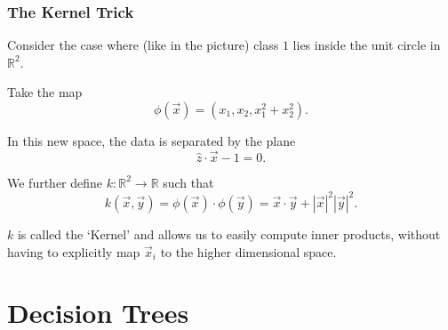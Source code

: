 \documentclass[mathserif,serif]{beamer}
\begin{document}
\begin{frame}
  \frametitle{The Kernel Trick}
  Consider the case where (like in the picture) class $1$ lies inside the unit circle in $\mathbb{R}^2$.

  \pause
  Take the map
  \begin{equation}
    \phi(\vec x) = (x_1, x_2, x_1^2+x_2^2).
  \end{equation}

  \pause
  In this new space, the data is separated by the plane
  \begin{equation}
    \hat z \cdot \vec x - 1 = 0.
  \end{equation}

  \pause
  We further define $k: \mathbb{R}^2 \to \mathbb{R}$ such that
  \begin{equation}
    k(\vec x, \vec y) = \phi(\vec x) \cdot \phi(\vec y) = \vec x \cdot \vec y + |\vec x|^2 |\vec y|^2.
  \end{equation}

  \pause
  $k$ is called the `Kernel' and allows us to easily compute inner products, without having to
  explicitly map $\vec x_i$ to the higher dimensional space.

\end{frame}

\section{Decision Trees}
\frame{\sectionpage}
\end{document}

